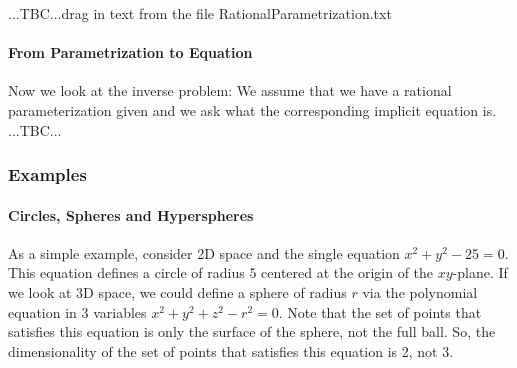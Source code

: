 
...TBC...drag in text from the file RationalParametrization.txt




\paragraph{From Parametrization to Equation}
Now we look at the inverse problem: We assume that we have a rational parameterization given and we ask what the corresponding implicit equation is. ...TBC...








\subsubsection{Examples}

\paragraph{Circles, Spheres and Hyperspheres}
As a simple example, consider 2D space and the single equation $x^2 + y^2 - 25 = 0$. This equation defines a circle of radius $5$ centered at the origin of the $xy$-plane. If we look at 3D space, we could define a sphere of radius $r$ via the polynomial equation in 3 variables $x^2 + y^2 + z^2 - r^2 = 0$. Note that the set of points that satisfies this equation is only the surface of the sphere, not the full ball. So, the dimensionality of the set of points that satisfies this equation is 2, not 3. 

